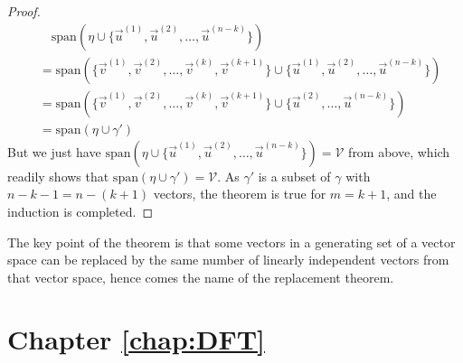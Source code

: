 \begin{proof}
\begin{align*}
&\quad \text{span}(\mathcal{\eta} \cup \{\vec{u}^{(1)}, \vec{u}^{(2)}, \ldots, \vec{u}^{(n-k)}\}) \\
&= \text{span}(\{\vec{v}^{(1)}, \vec{v}^{(2)}, \ldots, \vec{v}^{(k)}, \vec{v}^{(k+1)}\} \cup \{\vec{u}^{(1)}, \vec{u}^{(2)}, \ldots, \vec{u}^{(n-k)}\}) \\
&= \text{span}(\{\vec{v}^{(1)}, \vec{v}^{(2)}, \ldots, \vec{v}^{(k)}, \vec{v}^{(k+1)}\} \cup \{\vec{u}^{(2)}, \ldots, \vec{u}^{(n-k)}\}) \\
&= \text{span}(\mathcal{\eta} \cup \mathcal{\gamma'})
\end{align*}
But we just have $\text{span}(\mathcal{\eta} \cup \{\vec{u}^{(1)}, \vec{u}^{(2)}, \ldots, \vec{u}^{(n-k)}\}) = \mathcal{V}$ from above, which readily shows that $\text{span}(\mathcal{\eta} \cup \mathcal{\gamma'}) = \mathcal{V}$. As $\mathcal{\gamma'}$ is a subset of $\mathcal{\gamma}$ with $n - k-1 = n - (k+1)$ vectors, the theorem is true for $m = k+1$, and the induction is completed.
\end{proof}
The key point of the theorem is that some vectors in a generating set of a vector space can be replaced by the same number of linearly independent vectors from that vector space, hence comes the name of the replacement theorem.

\section{Chapter \ref*{chap:DFT}}
\label{section:DFTappend}

